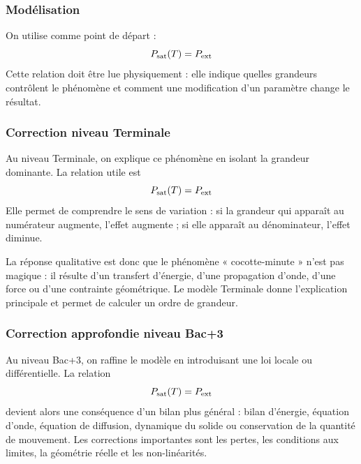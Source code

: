 \documentclass[11pt,a4paper]{article}
\begin{document}
\subsubsection*{Modélisation}

\begin{theorembox}
On utilise comme point de départ :
\[
P_{\rm sat}(T)=P_{\rm ext}
\]
Cette relation doit être lue physiquement : elle indique quelles grandeurs contrôlent le phénomène et comment une modification d'un paramètre change le résultat.
\end{theorembox}

\subsubsection*{Correction niveau Terminale}

\begin{corrigebox}

Au niveau Terminale, on explique ce phénomène en isolant la grandeur dominante. La relation utile est
\[
P_{\rm sat}(T)=P_{\rm ext}
\]
Elle permet de comprendre le sens de variation : si la grandeur qui apparaît au numérateur augmente, l'effet augmente ; si elle apparaît au dénominateur, l'effet diminue.

La réponse qualitative est donc que le phénomène « cocotte-minute » n'est pas magique : il résulte d'un transfert d'énergie, d'une propagation d'onde, d'une force ou d'une contrainte géométrique. Le modèle Terminale donne l'explication principale et permet de calculer un ordre de grandeur.

\end{corrigebox}

\subsubsection*{Correction approfondie niveau Bac+3}

\begin{approfondissementbox}

Au niveau Bac+3, on raffine le modèle en introduisant une loi locale ou différentielle. La relation
\[
P_{\rm sat}(T)=P_{\rm ext}
\]
devient alors une conséquence d'un bilan plus général : bilan d'énergie, équation d'onde, équation de diffusion, dynamique du solide ou conservation de la quantité de mouvement. Les corrections importantes sont les pertes, les conditions aux limites, la géométrie réelle et les non-linéarités.

\end{approfondissementbox}
\end{document}

